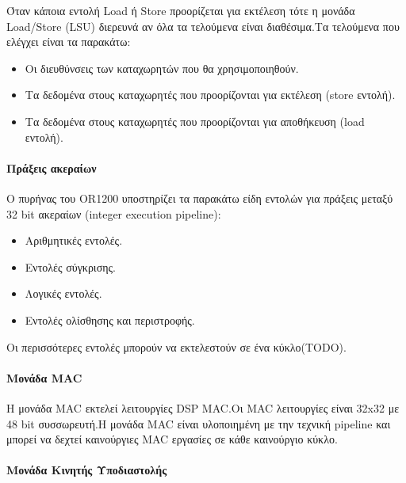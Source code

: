 \documentclass[a4paper,10pt]{article}
\numberwithin{figure}{subsection}
\numberwithin{table}{subsection}
\begin{document}
{Όταν κάποια εντολή Load ή Store προορίζεται για εκτέλεση τότε η μονάδα Load/Store (LSU)
διερευνά αν όλα τα τελούμενα είναι διαθέσιμα.Τα τελούμενα που ελέγχει είναι τα παρακάτω:


\begin{itemize}
 \item Οι διευθύνσεις των καταχωρητών που θα χρησιμοποιηθούν.
 \item Τα δεδομένα στους καταχωρητές που προορίζονται για εκτέλεση (store εντολή).
 \item Τα δεδομένα στους καταχωρητές που προορίζονται για αποθήκευση (load εντολή).
\end{itemize}

\paragraph{Πράξεις ακεραίων\newline\newline}

Ο πυρήνας του OR1200 υποστηρίζει τα παρακάτω είδη εντολών για πράξεις μεταξύ 32 bit ακεραίων (integer execution pipeline):
\begin{itemize}
 \item Αριθμητικές εντολές.
 \item Εντολές σύγκρισης.
 \item Λογικές εντολές.
 \item Εντολές ολίσθησης και περιστροφής.
\end{itemize}


Οι περισσότερες εντολές μπορούν να εκτελεστούν σε ένα κύκλο(TODO).


\paragraph{Μονάδα MAC\newline\newline}

Η μονάδα MAC εκτελεί λειτουργίες DSP MAC.Οι MAC λειτουργίες είναι 32x32 με 48 bit συσσωρευτή.Η μονάδα MAC είναι υλοποιημένη με την 
τεχνική pipeline και μπορεί να δεχτεί καινούργιες MAC εργασίες σε κάθε καινούργιο κύκλο.

\paragraph{Μονάδα Κινητής Υποδιαστολής\newline\newline}

}
\end{document}
